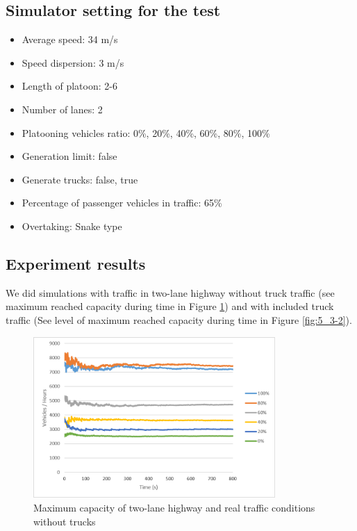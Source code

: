 \subsection*{Simulator setting for the test}

\begin{itemize}
\item Average speed: 34 m/s
\item Speed dispersion: 3 m/s
\item Length of platoon: 2-6
\item Number of lanes:  2
\item Platooning vehicles ratio: 0\%, 20\%, 40\%, 60\%, 80\%, 100\%
\item Generation limit: false
\item Generate trucks: false, true
\item Percentage of passenger vehicles in traffic: 65\%
\item Overtaking: Snake type
\end{itemize}

\subsection*{Experiment results}

We did simulations with traffic in two-lane highway without truck traffic (see maximum reached capacity during time in Figure \ref{fig:5_3-1}) and with included truck traffic (See level of maximum reached capacity during time in Figure \ref{fig:5_3-2}).

\begin{figure}[ph]
\centering
\includegraphics[width=0.82\textwidth,height=0.82\textheight,keepaspectratio]{figures/Chapter_5/5_max_2lane_Ntrucks.png}
\centering
\protect\caption[Maximum capacity of two-lane highway and real traffic conditions without trucks]{\label{fig:5_3-1}Maximum capacity of two-lane highway and real traffic conditions without trucks}
\end{figure}



